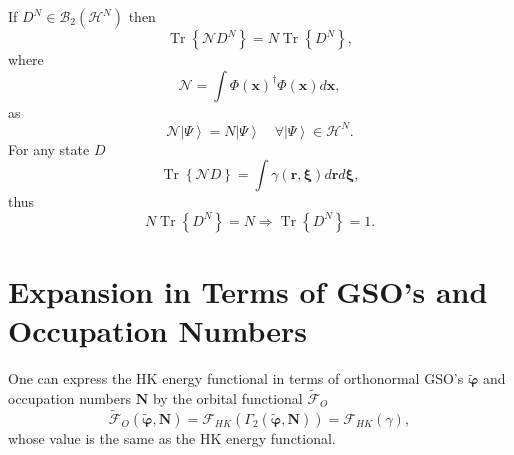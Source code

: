 \documentclass[aps,preprint]{revtex4}%
\begin{document}
If $D^{N}\in\mathcal{B}_{2}\left(  \mathcal{H}^{N}\right)  $ then
\begin{equation}
\operatorname{Tr}\left\{  \mathcal{N}D^{N}\right\}  =N\operatorname{Tr}%
\left\{  D^{N}\right\}  ,
\end{equation}
where
\begin{equation}
\mathcal{N}=\int\Phi\left(  \mathbf{x}\right)  ^{\dagger}\Phi\left(
\mathbf{x}\right)  d\mathbf{x,}%
\end{equation}
as
\begin{equation}
\mathcal{N}\left\vert \Psi\right\rangle =N\left\vert \Psi\right\rangle
\quad\forall\left\vert \Psi\right\rangle \in\mathcal{H}^{N}.
\end{equation}
For any state $D$
\begin{equation}
\operatorname{Tr}\left\{  \mathcal{N}D\right\}  =\int\gamma\left(
\mathbf{r,\xi}\right)  d\mathbf{r}d\mathbf{\xi,}%
\end{equation}
thus
\begin{equation}
N\operatorname{Tr}\left\{  D^{N}\right\}  =N\Rightarrow\operatorname{Tr}%
\left\{  D^{N}\right\}  =1.
\end{equation}


\section{Expansion in Terms of GSO's and Occupation Numbers\label{GSO&Occ}}

One can express the HK energy functional in terms of orthonormal GSO's
$\mathbf{\tilde{\varphi}}$ and occupation numbers $\mathbf{N}$ by the orbital
functional $\mathcal{\tilde{F}}_{O}$
\begin{equation}
\mathcal{\tilde{F}}_{O}\left(  \mathbf{\tilde{\varphi},N}\right)
=\mathcal{F}_{HK}\left(  \Gamma_{2}\left(  \mathbf{\tilde{\varphi},N}\right)
\right)  =\mathcal{F}_{HK}\left(  \gamma\right)  ,
\end{equation}
whose value is the same as the HK energy functional.
\end{document}
